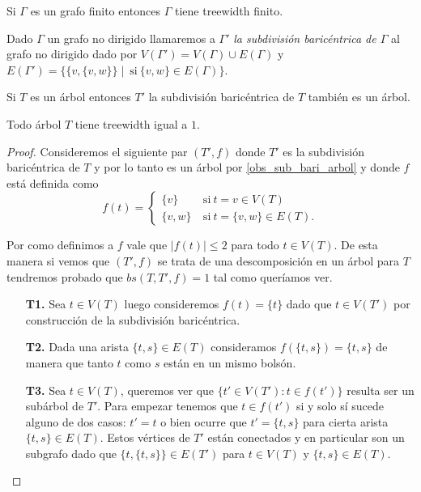 \documentclass[tesis.tex]{subfiles}
\begin{document}
\begin{obs}
	Si $\Gamma$ es un grafo finito entonces $\Gamma$ tiene treewidth finito. 
\end{obs}


\begin{deff}
	Dado $\Gamma$ un grafo no dirigido llamaremos a $\Gamma'$ \emph{la subdivisión baricéntrica de $\Gamma$ }al grafo no dirigido dado por
	$V(\Gamma') = V(\Gamma) \cup E(\Gamma)$ y $E(\Gamma') = \{ \{ v, \{v,w \} \} \mid \ \text{si} \ \{ v,w \} \in E(\Gamma) \}$.
\end{deff}




\begin{obs}\label{obs_sub_bari_arbol}
	Si $T$ es un árbol entonces $T'$ la subdivisión baricéntrica de $T$ también es un árbol.
\end{obs}

\begin{prop}\label{desc-arbol-arbol}
	Todo árbol $T$ tiene treewidth igual a  $1$.
\end{prop}

\begin{proof}
	Consideremos el siguiente par $(T',f)$ donde $T'$ es la subdivisión baricéntrica de $T$ y por lo tanto es un árbol por \ref{obs_sub_bari_arbol} y donde $f$ está definida como
	\[
	f(t) = 
	\begin{cases}
		\{ v \} \ & \text{si} \ t = v \in V(T) 				\\
		\{ v,w  \} \ &\text{si} \ t = \{ v,w\} \in E(T).
	\end{cases}
	\]
	
	
	Por como definimos a $f$ vale que $|f(t)| \le 2$ para todo $t \in V(T)$.
	De esta manera si vemos que $(T',f)$ se trata de una descomposición en un árbol para $T$ tendremos probado que $bs(T,T',f) = 1$ tal como queríamos ver.
	
	\begin{enumerate}
		\item[\textbf{T1.}] 
		Sea $t \in V(T)$ luego consideremos $f(t) = \{ t \}$ dado que $t \in V(T')$ por construcción de la subdivisión baricéntrica.
		
		\item[\textbf{T2.}] 
		Dada una arista $\{t,s\} \in E(T)$ consideramos $f(\{ t,s \}) = \{ t,s \} $ de manera que tanto $t$ como $s$ están en un mismo bolsón.
		
		\item[\textbf{T3.}] 
		Sea $t \in V(T)$, queremos ver que $\{ t' \in V(T') :  t \in f(t') \}$ resulta ser un subárbol de $T'$.		
		Para empezar tenemos que $t \in f(t')$ si y solo sí sucede alguno de dos casos:
		$t' = t$ o bien ocurre que $t' = \{ t,s \}$ para cierta arista $\{t,s\} \in E(T)$.
		Estos vértices de $T'$ están conectados y en particular son un subgrafo dado que $ \{t, \{t,s\}\} \in E(T')$ para $t \in V(T)$ y $\{t,s\} \in E(T)$. 
	\end{enumerate}
	
\end{proof}
	
\end{document}
